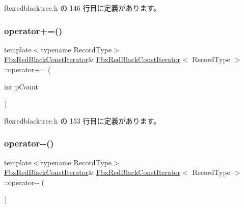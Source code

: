  fbxredblacktree.\+h の 146 行目に定義があります。

\mbox{\label{class_fbx_red_black_const_iterator_a52467ed33aa95df758d9bfffa13edf2e}} 
\subsubsection{\texorpdfstring{operator+=()}{operator+=()}}
{\footnotesize\ttfamily template$<$typename Record\+Type$>$ \\
\hyperlink{class_fbx_red_black_const_iterator}{Fbx\+Red\+Black\+Const\+Iterator}\& \hyperlink{class_fbx_red_black_const_iterator}{Fbx\+Red\+Black\+Const\+Iterator}$<$ Record\+Type $>$\+::operator+= (\begin{DoxyParamCaption}\item[{int}]{p\+Count }\end{DoxyParamCaption})\hspace{0.3cm}{\ttfamily [inline]}}



 fbxredblacktree.\+h の 153 行目に定義があります。

\mbox{\label{class_fbx_red_black_const_iterator_a44635304d3b9cbb8c61a20e9aead2ed4}} 
\subsubsection{\texorpdfstring{operator-\/-\/()}{operator--()}\hspace{0.1cm}{\footnotesize\ttfamily [1/2]}}
{\footnotesize\ttfamily template$<$typename Record\+Type$>$ \\
\hyperlink{class_fbx_red_black_const_iterator}{Fbx\+Red\+Black\+Const\+Iterator}\& \hyperlink{class_fbx_red_black_const_iterator}{Fbx\+Red\+Black\+Const\+Iterator}$<$ Record\+Type $>$\+::operator-\/-\/ (\begin{DoxyParamCaption}{ }\end{DoxyParamCaption})\hspace{0.3cm}{\ttfamily [inline]}}



